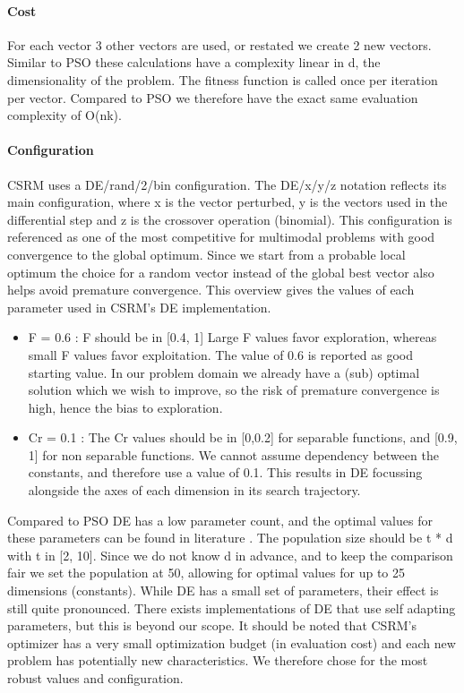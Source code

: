 \paragraph{Cost}\label{decost}
For each vector 3 other vectors are used, or restated we create 2 new vectors. Similar to PSO these calculations have a complexity linear in d, the dimensionality of the problem. The fitness function is called once per iteration per vector. Compared to PSO we therefore have the exact same evaluation complexity of O(nk).

\paragraph{Configuration}
CSRM uses a DE/rand/2/bin configuration. The DE/x/y/z notation reflects its main configuration, where x is the vector perturbed, y is the vectors used in the differential step and z is the crossover operation (binomial). This configuration is referenced \cite{DE} as one of the most competitive for multimodal problems with good convergence to the global optimum. Since we start from a probable local optimum the choice for a random vector instead of the global best vector also helps avoid premature convergence.
This overview gives the values of each parameter used in CSRM's DE implementation.
\begin{itemize}
\item F = 0.6 : F should be in [0.4, 1] Large F values favor exploration, whereas small F values favor exploitation. The value of 0.6 is reported as good starting value. In our problem domain we already have a (sub) optimal solution which we wish to improve, so the risk of premature convergence is high, hence the bias to exploration. 
\item Cr = 0.1 : The Cr values should be in [0,0.2] for separable functions, and [0.9, 1] for non separable functions. We cannot assume dependency between the constants, and therefore use a value of 0.1. This results in DE focussing alongside the axes of each dimension in its search trajectory. 
\end{itemize}
Compared to PSO DE has a low parameter count, and the optimal values for these parameters can be found in literature \cite{DESurveyLatest}. The population size should be t * d with t in [2, 10]. Since we do not know d in advance, and to keep the comparison fair we set the population at 50, allowing for optimal values for up to 25 dimensions (constants).
While DE has a small set of parameters, their effect is still quite pronounced. There exists implementations of DE that use self adapting parameters, but this is beyond our scope. It should be noted that CSRM's optimizer has a very small optimization budget (in evaluation cost) and each new problem has potentially new characteristics. We therefore chose for the most robust values and configuration.